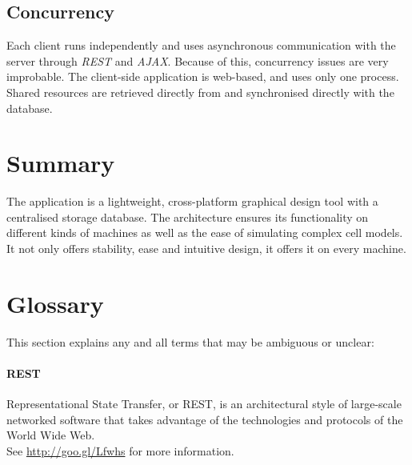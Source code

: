 \documentclass{report}
\begin{document}
		\subsection{Concurrency}
			Each client runs independently and uses asynchronous communication with the server through \emph{REST} and \emph{AJAX}. Because of this, concurrency issues are very improbable. The client-side application is web-based, and uses only one process. Shared resources are retrieved directly from and synchronised directly with the database.
	\clearpage
	\section{Summary}
		The application is a lightweight, cross-platform graphical design tool with a centralised storage database. The architecture ensures its functionality on different kinds of machines as well as the ease of simulating complex cell models. It not only offers stability, ease and intuitive design, it offers it on every machine.
	\section{Glossary}
		This section explains any and all terms that may be ambiguous or unclear:
		\paragraph{REST} 
			Representational State Transfer, or REST, is an architectural style of large-scale networked software that takes advantage of the technologies and protocols of the World Wide Web. \\
See \href{http://goo.gl/Lfwhs}{http://goo.gl/Lfwhs} for more information.
\end{document}
